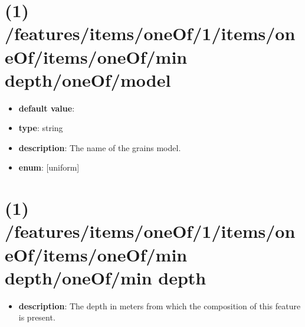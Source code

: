\section{(1) /features/items/oneOf/1/items/oneOf/items/oneOf/min depth/oneOf/model}
\begin{itemize}[leftmargin=1em]\item {\bf default value}: 
\item {\bf type}: string
\item {\bf description}: The name of the grains model.
\item {\bf enum}: [uniform]\end{itemize}\section{(1) /features/items/oneOf/1/items/oneOf/items/oneOf/min depth/oneOf/min depth}
\begin{itemize}[leftmargin=1em]\item {\bf description}: The depth in meters from which the composition of this feature is present.
\end{itemize}
